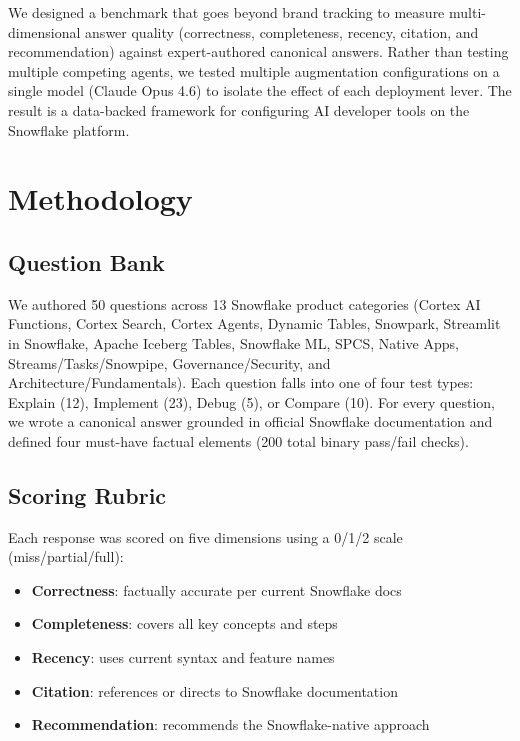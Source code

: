 \documentclass[11pt,letterpaper]{article}
\begin{document}
We designed a benchmark that goes beyond brand tracking to measure multi-dimensional answer quality (correctness, completeness, recency, citation, and recommendation) against expert-authored canonical answers. Rather than testing multiple competing agents, we tested multiple augmentation configurations on a single model (Claude Opus 4.6) to isolate the effect of each deployment lever. The result is a data-backed framework for configuring AI developer tools on the Snowflake platform.

\section{Methodology}

\subsection{Question Bank}

We authored 50 questions across 13 Snowflake product categories (Cortex AI Functions, Cortex Search, Cortex Agents, Dynamic Tables, Snowpark, Streamlit in Snowflake, Apache Iceberg Tables, Snowflake ML, SPCS, Native Apps, Streams/Tasks/Snowpipe, Governance/Security, and Architecture/Fundamentals). Each question falls into one of four test types: Explain (12), Implement (23), Debug (5), or Compare (10). For every question, we wrote a canonical answer grounded in official Snowflake documentation and defined four must-have factual elements (200 total binary pass/fail checks).

\subsection{Scoring Rubric}

Each response was scored on five dimensions using a 0/1/2 scale (miss/partial/full):

\begin{itemize}[nosep]
  \item \textbf{Correctness}: factually accurate per current Snowflake docs
  \item \textbf{Completeness}: covers all key concepts and steps
  \item \textbf{Recency}: uses current syntax and feature names
  \item \textbf{Citation}: references or directs to Snowflake documentation
  \item \textbf{Recommendation}: recommends the Snowflake-native approach
\end{itemize}
\end{document}
